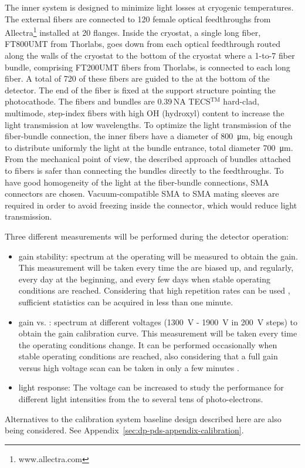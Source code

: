 The inner system is designed to minimize light losses at cryogenic temperatures. The external fibers are connected to 120 female optical feedthroughs from Allectra\footnote{www.allectra.com} installed at \num{20} flanges. Inside the cryostat, a single long fiber, FT800UMT from Thorlabs, goes down from each optical feedthrough routed along the walls of the cryostat to the bottom of the cryostat where a \num{1}-to-\num{7} fiber bundle, comprising FT200UMT fibers from Thorlabs, is connected to each long fiber. A total of \num{720} of these fibers are guided to the  at the bottom of the detector. The end of the fiber is fixed at the  support structure pointing the photocathode. The fibers and bundles are \num{0.39}\,NA TECS$^\text{TM}$ hard-clad, multimode, step-index fibers with high OH (hydroxyl) content to increase the light transmission at low wavelengths. To optimize the light transmission of the fiber-bundle connection, the inner fibers have a diameter of \SI{800}{\um}, big enough to distribute uniformly the light at the bundle entrance, total diameter \SI{700}{\um}.  From the mechanical point of view, the described approach of bundles attached to fibers is safer than connecting  the bundles directly to the feedthroughs. To have good homogeneity of the light at the fiber-bundle connections, SMA connectors are chosen. Vacuum-compatible SMA to SMA mating sleeves are required in order to avoid  freezing inside the connector, which would reduce light transmission.

Three different measurements will be performed during the detector operation:
\begin{itemize}
    \item gain stability:  spectrum at the  operating  will be measured to obtain the gain. This measurement will be taken every time the  are biased up, and regularly, every day at the beginning, and every few days when stable operating conditions are reached. Considering that high  repetition rates can be used \cite{Belver:2019lqm}, sufficient  statistics can be acquired in less than one minute. 
    \item gain vs. :  spectrum at different  voltages (\SI{1300}{\V} - \SI{1900}{V} in \SI{200}{V} steps) to obtain the gain calibration curve. This measurement will be taken every time the operating conditions change. It can be performed occasionally when stable operating conditions are reached, also considering that a full gain versus high voltage scan can be taken in only a few minutes .  
    \item light response: The  voltage can be increased to study the  performance for different light intensities from the  to several tens of photo-electrons.
\end{itemize}

Alternatives to the calibration system baseline design described here are also being considered. See Appendix~\ref{sec:dp-pds-appendix-calibration}. 



